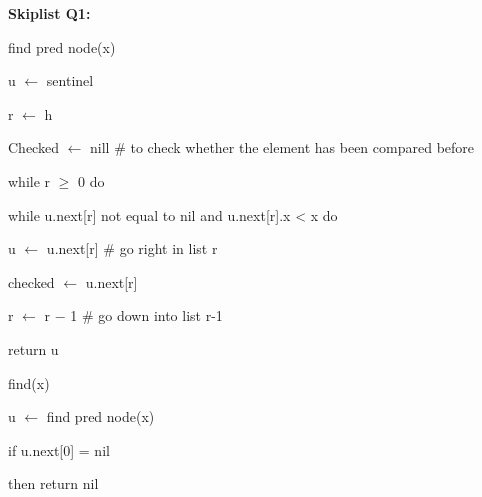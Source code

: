 \documentclass[12pt]{article}
\renewcommand{\_}{\kern-1.5pt\textunderscore\kern-1.5pt}
\begin{document}
\textbf{Skiplist Q1:}\par


\vspace{\baselineskip}
find pred node(x) \par

u $ \leftarrow $  sentinel \par

r $ \leftarrow $  h \par

Checked $ \leftarrow $  nill $\#$ to check whether the element has been compared before\par

while r $ \geq $  0 do \par

\begin{adjustwidth}{0.5in}{0.0in}
while u.next[r] not equal to nil and u.next[r].x < x do \par

\end{adjustwidth}

\begin{adjustwidth}{1.0in}{0.0in}
u $ \leftarrow $  u.next[r] $\#$  go right in list r\par

\end{adjustwidth}

\begin{adjustwidth}{1.0in}{0.0in}
checked $ \leftarrow $  u.next[r]\par

\end{adjustwidth}

\begin{adjustwidth}{1.0in}{0.0in}
 r $ \leftarrow $  r $-$  1 $\#$  go down into list r-1 \par

\end{adjustwidth}

return u \par

find(x) \par

u $ \leftarrow $  find pred node(x)\par

if u.next[0] = nil \par

\begin{adjustwidth}{0.5in}{0.0in}
then return nil \par

\end{adjustwidth}
\end{document}
